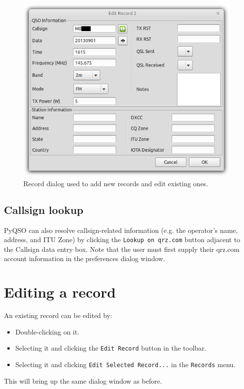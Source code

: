 \documentclass[11pt, a4paper]{report}
\begin{document}
\begin{figure}
  \centering
  \includegraphics[width=1\columnwidth]{images/edit_record.png}
  \caption{Record dialog used to add new records and edit existing ones.}
  \label{fig:edit_record}
\end{figure}

\subsection{Callsign lookup}
PyQSO can also resolve callsign-related information (e.g. the operator's name, address, and ITU Zone) by clicking the \texttt{Lookup on qrz.com} button adjacent to the Callsign data entry box. Note that the user must first supply their qrz.com account information in the preferences dialog window.

\section{Editing a record}
An existing record can be edited by:
\begin{itemize}
  \item Double-clicking on it.
  \item Selecting it and clicking the \texttt{Edit Record} button in the toolbar.
  \item Selecting it and clicking \texttt{Edit Selected Record...} in the \texttt{Records} menu.
\end{itemize}
This will bring up the same dialog window as before.
\end{document}
